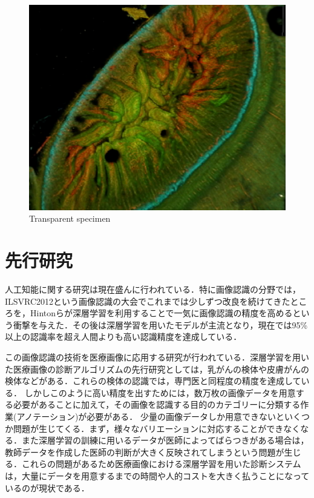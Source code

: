 \begin{figure}[H]
\begin{minipage}[b]{0.4\columnwidth}
		\includegraphics[clip, width=\linewidth]{fig/chapter1/colon_microscope}
	\end{minipage}
	\caption{Transparent specimen}
	\label{fig:lucid}
\end{figure}


\section{先行研究}\label{sec:先行研究}
人工知能に関する研究は現在盛んに行われている．特に画像認識の分野では，ILSVRC2012という画像認識の大会でこれまでは少しずつ改良を続けてきたところを，Hintonらが深層学習を利用することで一気に画像認識の精度を高めるという衝撃を与えた\cite{AlexNet}．その後は深層学習を用いたモデルが主流となり，現在では95\%以上の認識率を超え人間よりも高い認識精度を達成している\cite{ResNet}．

この画像認識の技術を医療画像に応用する研究が行われている．深層学習を用いた医療画像の診断アルゴリズムの先行研究としては，乳がん\cite{wang2016deep}の検体や皮膚がん\cite{esteva2017dermatologist}の検体などがある．これらの検体の認識では，専門医と同程度の精度を達成している．
しかしこのように高い精度を出すためには，数万枚の画像データを用意する必要があることに加えて，その画像を認識する目的のカテゴリーに分類する作業(アノテーション)が必要がある．
少量の画像データしか用意できないといくつか問題が生じてくる．まず，様々なバリエーションに対応することができなくなる．また深層学習の訓練に用いるデータが医師によってばらつきがある場合は，教師データを作成した医師の判断が大きく反映されてしまうという問題が生じる．これらの問題があるため医療画像における深層学習を用いた診断システムは，大量にデータを用意するまでの時間や人的コストを大きく払うことになっているのが現状である．

